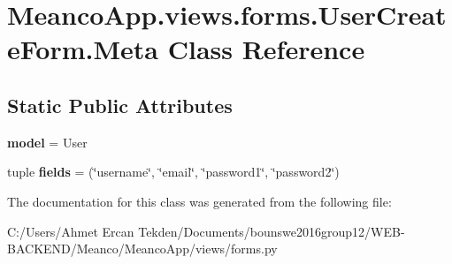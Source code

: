 \hypertarget{class_meanco_app_1_1views_1_1forms_1_1_user_create_form_1_1_meta}{}\section{Meanco\+App.\+views.\+forms.\+User\+Create\+Form.\+Meta Class Reference}
\label{class_meanco_app_1_1views_1_1forms_1_1_user_create_form_1_1_meta}
\subsection*{Static Public Attributes}
\begin{DoxyCompactItemize}
\item 
\hypertarget{class_meanco_app_1_1views_1_1forms_1_1_user_create_form_1_1_meta_ace91240fbbf851d815e30540787a96c1}{}\label{class_meanco_app_1_1views_1_1forms_1_1_user_create_form_1_1_meta_ace91240fbbf851d815e30540787a96c1} 
{\bfseries model} = User
\item 
\hypertarget{class_meanco_app_1_1views_1_1forms_1_1_user_create_form_1_1_meta_a3591b3775a7c7ce3c63de49286c84548}{}\label{class_meanco_app_1_1views_1_1forms_1_1_user_create_form_1_1_meta_a3591b3775a7c7ce3c63de49286c84548} 
tuple {\bfseries fields} = (\char`\"{}username\char`\"{}, \char`\"{}email\char`\"{}, \char`\"{}password1\char`\"{}, \char`\"{}password2\char`\"{})
\end{DoxyCompactItemize}


The documentation for this class was generated from the following file\+:\begin{DoxyCompactItemize}
\item 
C\+:/\+Users/\+Ahmet Ercan Tekden/\+Documents/bounswe2016group12/\+W\+E\+B-\/\+B\+A\+C\+K\+E\+N\+D/\+Meanco/\+Meanco\+App/views/forms.\+py\end{DoxyCompactItemize}
